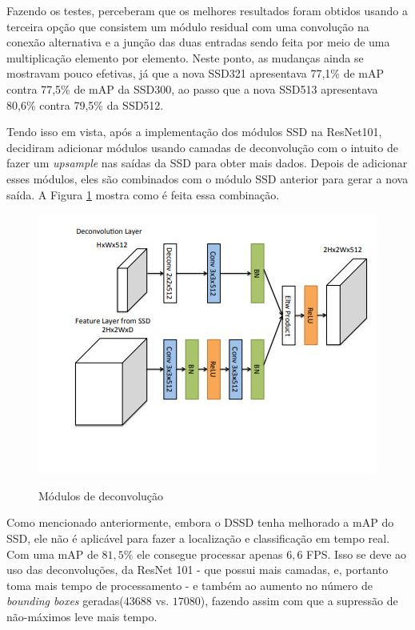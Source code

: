 Fazendo os testes,  perceberam que os melhores resultados foram obtidos usando a terceira opção que consistem um módulo residual com uma convolução na conexão alternativa e a junção das duas entradas sendo feita por meio de uma multiplicação elemento por elemento. Neste ponto, as mudanças ainda se mostravam pouco efetivas, já que a nova \ac{SSD}321 apresentava 77,1\% de \ac{mAP} contra 77,5\% de \ac{mAP} da \ac{SSD}300, ao passo que a nova \ac{SSD}513 apresentava 80,6\% contra 79,5\% da \ac{SSD}512.

Tendo isso em vista, após a implementação dos módulos \ac{SSD} na \ac{ResNet}101,  decidiram adicionar módulos usando camadas de deconvolução com o intuito de fazer um \textit{upsample} nas saídas da \ac{SSD} para obter mais dados. Depois de adicionar esses módulos, eles são combinados com o módulo \ac{SSD} anterior para gerar a nova saída. A Figura \ref{fig:deconv} mostra como é feita essa combinação.

\begin{figure}[t]
	\setlength{\abovecaptionskip}{0pt}
	\setlength{\belowcaptionskip}{0pt}
	\caption[Módulos de deconvolução]{Módulos de deconvolução}
	\centering
	\includegraphics[width=.6\textwidth]{imagem/0x_dssd-deconv.jpg}
	\captionsetup{justification=centering}
	\label{fig:deconv}
\end{figure}

Como mencionado anteriormente, embora o \ac{DSSD} tenha melhorado a \ac{mAP} do \ac{SSD}, ele não é aplicável para fazer a localização e classificação em tempo real. Com uma \ac{mAP} de $81,5\%$ ele consegue processar apenas $6,6$ \ac{FPS}. Isso se deve ao uso das deconvoluções, da ResNet 101 - que possui mais camadas, e, portanto toma mais tempo de processamento - e também ao aumento no número de \textit{bounding boxes} geradas($43688$ vs. $17080$), fazendo assim com que a supressão de não-máximos leve mais tempo.

